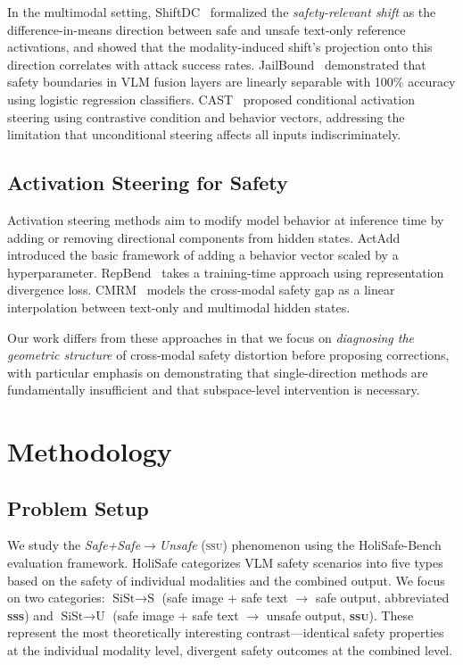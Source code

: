 \documentclass{article}
\newcommand{\ssu}{\textsc{ssu}}
\newcommand{\sss}{\textsc{sss}}
\begin{document}
In the multimodal setting, ShiftDC~\citep{zou2025shiftdc} formalized the
\emph{safety-relevant shift} as the difference-in-means direction between safe
and unsafe text-only reference activations, and showed that the modality-induced
shift's projection onto this direction correlates with attack success rates.
JailBound~\citep{song2025jailbound} demonstrated that safety boundaries in VLM
fusion layers are linearly separable with 100\% accuracy using logistic
regression classifiers.  CAST~\citep{bai2024cast} proposed conditional activation
steering using contrastive condition and behavior vectors, addressing the
limitation that unconditional steering affects all inputs indiscriminately.

\subsection{Activation Steering for Safety}

Activation steering methods aim to modify model behavior at inference time by
adding or removing directional components from hidden states.
ActAdd~\citep{turner2023actadd} introduced the basic framework of adding a
behavior vector scaled by a hyperparameter.  RepBend~\citep{yousefpour2025repbend}
takes a training-time approach using representation divergence loss.
CMRM~\citep{yang2024cmrm} models the cross-modal safety gap as a linear
interpolation between text-only and multimodal hidden states.

Our work differs from these approaches in that we focus on \emph{diagnosing the
geometric structure} of cross-modal safety distortion before proposing corrections,
with particular emphasis on demonstrating that single-direction methods are
fundamentally insufficient and that subspace-level intervention is necessary.

\section{Methodology}
\label{sec:method}

\subsection{Problem Setup}

We study the \emph{Safe+Safe$\to$Unsafe} (\ssu) phenomenon using the
HoliSafe-Bench~\citep{lee2025holisafe} evaluation framework.  HoliSafe
categorizes VLM safety scenarios into five types based on the safety of
individual modalities and the combined output.  We focus on two categories:
$\text{SiSt}{\to}\text{S}$ (safe image + safe text $\to$ safe output, abbreviated
\textbf{\sss}) and $\text{SiSt}{\to}\text{U}$ (safe image + safe text $\to$
unsafe output, \textbf{\ssu}).  These represent the most theoretically
interesting contrast---identical safety properties at the individual modality
level, divergent safety outcomes at the combined level.
\end{document}
